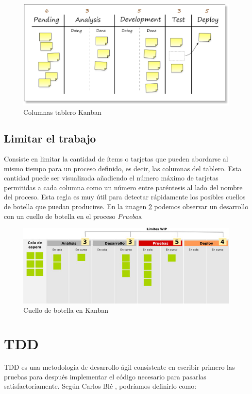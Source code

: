 	\begin{figure}[H]
	\centering
	\includegraphics[width=120mm, fbox={\fboxrule} 4mm]{images/04-metodo/03-kanban_table_2.png}
	\caption{Columnas tablero Kanban}
	\label{fig:kanban_table_2}
	\end{figure}
	
	\subsection{Limitar el trabajo}
	Consiste en limitar la cantidad de ítems o tarjetas que pueden abordarse al mismo tiempo para un proceso definido, es decir, las columnas del tablero. Esta cantidad puede ser visualizada añadiendo el número máximo de tarjetas permitidas a cada columna como un número entre paréntesis al lado del nombre del proceso.
	Esta regla es muy útil para detectar rápidamente los posibles cuellos de botella que puedan producirse. En la imagen \ref{fig:kanban_table_3} podemos observar un desarrollo con un cuello de botella en el proceso \textit{Pruebas}.
	
	\begin{figure}[H]
	\centering
	\includegraphics[width=120mm, fbox={\fboxrule} 4mm]{images/04-metodo/04-kanban_table_3.jpg}
	\caption{Cuello de botella en Kanban}
	\label{fig:kanban_table_3}
	\end{figure}

\section{\acs{TDD}}
	\acf{TDD} es una metodología de desarrollo ágil consistente en escribir primero las pruebas para después implementar el código necesario para pasarlas satisfactoriamente. Según Carlos Blé \cite{Ble10}, podríamos definirlo como:
	
